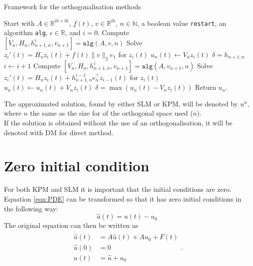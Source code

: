 \begin{algorithm}[h]
\begin{algorithmic} \caption{Framework for the orthogonalisation methods\cite{min}} \label{alg:PM} 
\STATE Start with $A \in \mathbb{R}^{\hat{m} \times \hat{m}}$, $f(t)$, $v \in \mathbb{R}^{\hat{m}}$, $n \in \mathbb{N}$, a boolean value \texttt{restart}, an algorithm \texttt{alg}, $\epsilon \in \mathbb{R}$, and $i = 0$.
\STATE Compute $[V_n,H_n,h_{n+1,n}^i,v_{n+1}] = \texttt{alg}(A,v,n)$
\STATE Solve $  z_i'(t) = H_n z_i(t) + f(t) \| v \|_2 e_1  $ for $z_i(t)$
\STATE $ u_n(t) \leftarrow  V_n z_i(t) $
\STATE $ \delta = h_{n+1,n} $ 
	\WHILE{ $\epsilon < \delta$  } 
    		\STATE $i \leftarrow i + 1$
    		\STATE Compute $[V_n,H_n,h_{n+1,n}^i,v_{n+1}] = \texttt{alg}(A,v_{n+1},n)$
    		\STATE Solve $ z_i'(t) = H_n z_i(t) + h_{n+1,n}^{i-1}e_n^\top z_{i-1}(t)  $ for $z_i(t)$
    		\STATE $ u_n(t) \leftarrow u_n(t) + V_n z_i(t) $
    		\STATE $\delta = \max(u_n(t) - V_n z_i(t))$
	\ENDWHILE
\ENDIF
\STATE Return $u_n$.
\end{algorithmic} 
\end{algorithm}

The approximated solution, found by either SLM or KPM, will be denoted by $u^n$, where $n$ the same as the size for of the orthogonal space used ($n$). \\

If the solution is obtained without the use of an orthogonalisation, it will be denoted with DM for direct method.


\section{Zero initial condition}
For both KPM and SLM it is important that the initial conditions are zero. Equation \eqref{eqn:PDE} can be transformed so that it has zero initial conditions in the following way:
\begin{equation*}
\hat{u}(t) = u(t)-u_0
\end{equation*}
The original equation can then be written as
\begin{equation}
\begin{aligned}
\dot{\hat{u}}(t) &= A \hat{u}(t) +A u_0 + F(t) \\
 \hat{u}(0)&= 0 \\
 u(t) &= \hat{u} + u_0 \\
\end{aligned}.
\end{equation}

